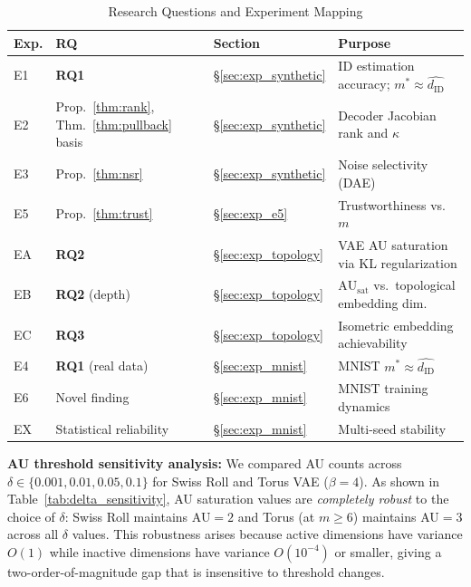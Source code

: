 \documentclass[lettersize,journal]{IEEEtran}
\newcommand{\dID}{d_{\mathrm{ID}}}
\newcommand{\kap}{\kappa}
\newcommand{\AUsat}{\mathrm{AU}_{\mathrm{sat}}}
\begin{document}
\begin{table}[!t]
\centering
\caption{Research Questions and Experiment Mapping}
\label{tab:rq_exp_map}
\begin{tabular}{l l l p{6cm}}
\toprule
Exp. & RQ & Section & Purpose \\
\midrule
E1 & \textbf{RQ1} & \S\ref{sec:exp_synthetic} & ID estimation accuracy; $m^* \approx \hat{\dID}$ \\
E2 & Prop.~\ref{thm:rank}, Thm.~\ref{thm:pullback} basis & \S\ref{sec:exp_synthetic} & Decoder Jacobian rank and $\kap$ \\
E3 & Prop.~\ref{thm:nsr} & \S\ref{sec:exp_synthetic} & Noise selectivity (DAE) \\
E5 & Prop.~\ref{thm:trust} & \S\ref{sec:exp_e5} & Trustworthiness vs.\ $m$ \\
EA & \textbf{RQ2} & \S\ref{sec:exp_topology} & VAE AU saturation via KL regularization \\
EB & \textbf{RQ2} (depth) & \S\ref{sec:exp_topology} & $\AUsat$ vs.\ topological embedding dim. \\
EC & \textbf{RQ3} & \S\ref{sec:exp_topology} & Isometric embedding achievability \\
E4 & \textbf{RQ1} (real data) & \S\ref{sec:exp_mnist} & MNIST $m^* \approx \hat{\dID}$ \\
E6 & Novel finding & \S\ref{sec:exp_mnist} & MNIST training dynamics \\
EX & Statistical reliability & \S\ref{sec:exp_mnist} & Multi-seed stability \\
\bottomrule
\end{tabular}
\end{table}

\textbf{AU threshold sensitivity analysis:}
We compared AU counts across $\delta \in \{0.001, 0.01, 0.05, 0.1\}$ for Swiss Roll and Torus VAE ($\beta=4$).
As shown in Table~\ref{tab:delta_sensitivity}, AU saturation values are \emph{completely robust} to the choice of $\delta$: Swiss Roll maintains AU$=2$ and Torus (at $m\geq6$) maintains AU$=3$ across all $\delta$ values.
This robustness arises because active dimensions have variance $O(1)$ while inactive dimensions have variance $O(10^{-4})$ or smaller, giving a two-order-of-magnitude gap that is insensitive to threshold changes.
\end{document}
